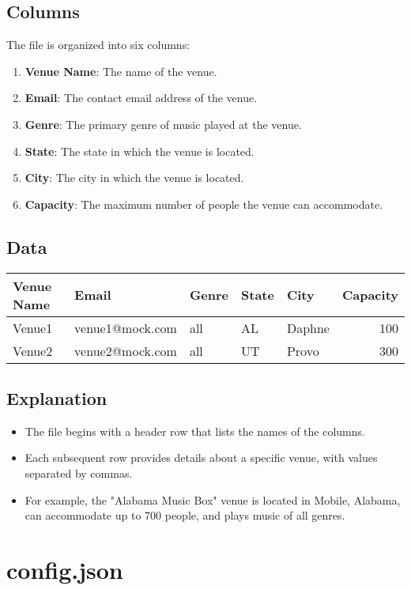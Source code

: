 \documentclass{article}
\begin{document}
	\subsection*{Columns}
	The file is organized into six columns:
	\begin{enumerate}
		\item \textbf{Venue Name}: The name of the venue.
		\item \textbf{Email}: The contact email address of the venue.
		\item \textbf{Genre}: The primary genre of music played at the venue.
		\item \textbf{State}: The state in which the venue is located.
		\item \textbf{City}: The city in which the venue is located.
		\item \textbf{Capacity}: The maximum number of people the venue can accommodate.
	\end{enumerate}
	
	\subsection*{Data}
	
	\begin{tabular}{|l|l|l|l|l|r|}
		\hline
		\textbf{Venue Name} & \textbf{Email} & \textbf{Genre} & \textbf{State} & \textbf{City} & \textbf{Capacity} \\
		\hline
		Venue1 & venue1@mock.com & all & AL & Daphne & 100 \\
		\hline
		Venue2 & venue2@mock.com & all & UT & Provo & 300 \\
		\hline
	\end{tabular}
	
	\subsection*{Explanation}
	\begin{itemize}
		\item The file begins with a header row that lists the names of the columns.
		\item Each subsequent row provides details about a specific venue, with values separated by commas.
		\item For example, the "Alabama Music Box" venue is located in Mobile, Alabama, can accommodate up to 700 people, and plays music of all genres.
	\end{itemize}
	
	\section{config.json}
	
\end{document}
